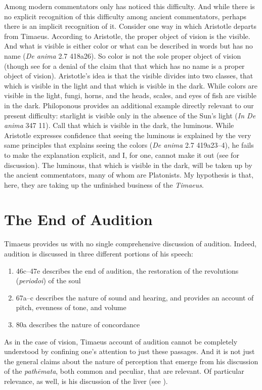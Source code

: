 Among modern commentators only \citet[180--1]{Broadie:2012vl} has noticed this difficulty. And while there is no explicit recognition of this difficulty among ancient commentators, perhaps there is an implicit recognition of it. Consider one way in which Aristotle departs from Timaeus. According to Aristotle, the proper object of vision is the visible. And what is visible is either color or what can be described in words but has no name (\emph{De anima} 2.7 418a26). So color is not the sole proper object of vision (though see \citealt[252]{Polansky:2007ly} for a denial of the claim that that which has no name is a proper object of vision). Aristotle's idea is that the visible divides into two classes, that which is visible in the light and that which is visible in the dark. While colors are visible in the light, fungi, horns, and the heads, scales, and eyes of fish are visible in the dark. Philoponous provides an additional example directly relevant to our present difficulty: starlight is visible only in the absence of the Sun's light (\emph{In De anima} 347 11). Call that which is visible in the dark, the luminous. While Aristotle expresses confidence that seeing the luminous is explained by the very same principles that explains seeing the colors (\emph{De anima} 2.7 419a23--4), he fails to make the explanation explicit, and I, for one, cannot make it out (see \citealt[69--73]{Kalderon:2015fr} for discussion). The luminous, that which is visible in the dark, will be taken up by the ancient commentators, many of whom are Platonists. My hypothesis is that, here, they are taking up the unfinished business of the \emph{Timaeus}.


\section{The End of Audition} %
\label{sec:the_end_of_audition}

Timaeus provides us with no single comprehensive discussion of audition. Indeed, audition is discussed in three different portions of his speech:
\begin{enumerate}
	\item 46c–47e describes the end of audition, the restoration of the revolutions (\emph{periodoi}) of the soul
	\item 67a–c describes the nature of sound and hearing, and provides an account of pitch, evenness of tone, and volume
	\item 80a describes the nature of concordance
\end{enumerate}
As in the case of vision, Timaeus account of audition cannot be completely understood by confining one's attention to just these passages. And it is not just the general claims about the nature of perception that emerge from his discussion of the \emph{pathēmata}, both common and peculiar, that are relevant. Of particular relevance, as well, is his discussion of the liver (see \citealt{Barker:2000dy}).

